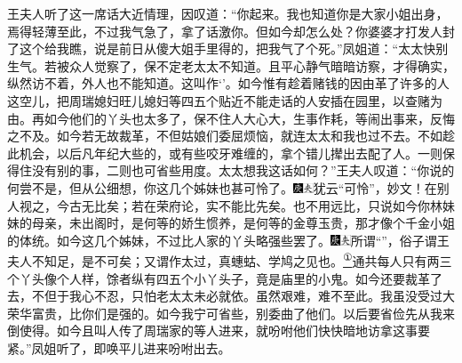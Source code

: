 王夫人听了这一席话大近情理，因叹道：``你起来。我也知道你是大家小姐出身，焉得轻薄至此，不过我气急了，拿了话激你。但如今却怎么处？你婆婆才打发人封了这个给我瞧，说是前日从傻大姐手里得的，把我气了个死。''凤姐道：``太太快别生气。若被众人觉察了，保不定老太太不知道。且平心静气暗暗访察，才得确实，纵然访不着，外人也不能知道。这叫作`'。如今惟有趁着赌钱的因由革了许多的人这空儿，把周瑞媳妇旺儿媳妇等四五个贴近不能走话的人安插在园里，以查赌为由。再如今他们的丫头也太多了，保不住人大心大，生事作耗，等闹出事来，反悔之不及。如今若无故裁革，不但姑娘们委屈烦恼，就连太太和我也过不去。不如趁此机会，以后凡年纪大些的，或有些咬牙难缠的，拿个错儿撵出去配了人。一则保得住没有别的事，二则也可省些用度。太太想我这话如何？''王夫人叹道：``你说的何尝不是，但从公细想，你这几个姊妹也甚可怜了。{\includegraphics[width=3mm]{../Images/00004}\includegraphics[width=3mm]{../Images/00012}\footnotesize \kaishu 犹云``可怜''，妙文！在别人视之，今古无比矣；若在荣府论，实不能比先矣。}也不用远比，只说如今你林妹妹的母亲，未出阁时，是何等的娇生惯养，是何等的金尊玉贵，那才像个千金小姐的体统。如今这几个姊妹，不过比人家的丫头略强些罢了。{\includegraphics[width=3mm]{../Images/00004}\includegraphics[width=3mm]{../Images/00012}\footnotesize \kaishu 所谓``''，俗子谓王夫人不知足，是不可矣；又谓作太过，真蟪蛄、学鸠之见也。}\href{../Text/part0078_split_000.html\#lnkback_1_a}{\textsuperscript{①}}通共每人只有两三个丫头像个人样，馀者纵有四五个小丫头子，竟是庙里的小鬼。如今还要裁革了去，不但于我心不忍，只怕老太太未必就依。虽然艰难，难不至此。我虽没受过大荣华富贵，比你们是强的。如今我宁可省些，别委曲了他们。以后要省俭先从我来倒使得。如今且叫人传了周瑞家的等人进来，就吩咐他们快快暗地访拿这事要紧。''凤姐听了，即唤平儿进来吩咐出去。

